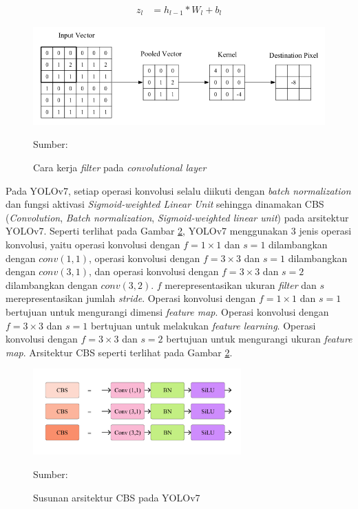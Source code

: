     \begin{align}
        \label{eq:conv-layer}
        z_l &= h_{l-1}\ast W_l + b_l
    \end{align}

    \begin{figure}[H]
        \begin{center}
            \includegraphics[width=12cm]{img/bab2/convlayer.PNG}
            \caption{Cara kerja \textit{filter} pada \textit{convolutional layer}}
            \label{fig:conv}
            Sumber: \citep{OShea2015}
        \end{center}
    \end{figure}

    Pada YOLOv7, setiap operasi konvolusi selalu diikuti dengan \textit{batch normalization} dan fungsi aktivasi \textit{Sigmoid-weighted Linear Unit} sehingga dinamakan CBS (\textit{Convolution}, \textit{Batch normalization}, \textit{Sigmoid-weighted linear unit}) pada arsitektur YOLOv7. Seperti terlihat pada Gambar \ref{fig:cbs}, YOLOv7 menggunakan 3 jenis operasi konvolusi, yaitu operasi konvolusi dengan $f=1\times 1$ dan $s=1$ dilambangkan dengan $conv(1, 1)$, operasi konvolusi dengan $f=3\times 3$ dan $s=1$ dilambangkan dengan $conv(3, 1)$, dan operasi konvolusi dengan $f=3\times 3$ dan $s=2$ dilambangkan dengan $conv(3, 2)$. $f$ merepresentasikan ukuran \textit{filter} dan $s$ merepresentasikan jumlah \textit{stride}. Operasi konvolusi dengan $f=1\times 1$ dan $s=1$ bertujuan untuk mengurangi dimensi \textit{feature map}. Operasi konvolusi dengan $f=3\times 3$ dan $s=1$ bertujuan untuk melakukan \textit{feature learning}. Operasi konvolusi dengan $f=3\times 3$ dan $s=2$ bertujuan untuk mengurangi ukuran \textit{feature map}. Arsitektur CBS seperti terlihat pada Gambar \ref{fig:cbs}.

    \begin{figure}[H]
        \begin{center}
            \includegraphics[width=8cm]{img/bab2/cbs.png}
            \caption{Susunan arsitektur CBS pada YOLOv7}
            \label{fig:cbs}
            Sumber: \citep{Wang2022}
        \end{center}
    \end{figure}

